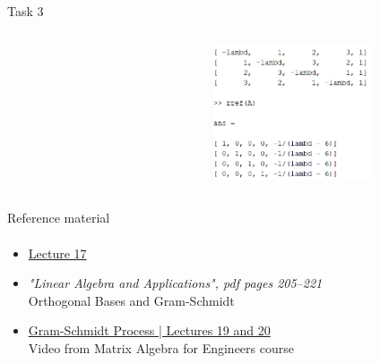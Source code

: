\documentclass[aspectratio=169]{beamer}
\newcommand{\fbckg}[1]{\usebackgroundtemplate{\texttt{[image: \#1]}}}%
\begin{document}
\begin{frame}[t]{Task 3}
{\begin{columns}[T,onlytextwidth]
\begin{column}{0.64\textwidth}
            \end{column}
            \begin{column}{0.35\textwidth}
                \vspace{-0.3cm}
                \begin{figure}[H]
                    \centering\includegraphics[height=4cm,width=1\textwidth,keepaspectratio]{task3_ans.png}
                    \label{fig:task3_ans.png}
                \end{figure}
            \end{column}
        \end{columns}
        
    }
\end{frame}

\begin{frame}[t]{Reference material}
    \framesubtitle{}
    \Large
    \begin{itemize}
        \item \href{https://www.youtube.com/watch?v=Y_Ac6KiQ1t0&list=PL49CF3715CB9EF31D&index=17}{Lecture 17}
        \item \textit{"Linear Algebra and Applications", pdf pages 205--221 }\\ Orthogonal Bases and Gram-Schmidt
        \item \href{https://www.youtube.com/watch?v=eib8uAlzegc&list=PLkZjai-2Jcxlg-Z1roB0pUwFU-P58tvOx&index=20}{Gram-Schmidt Process | Lectures 19 and 20}\\ Video from Matrix Algebra for Engineers course
    \end{itemize}
\end{frame}

\fbckg{fibeamer/figs/last_page.png}
\frame[plain]{}
\end{document}
